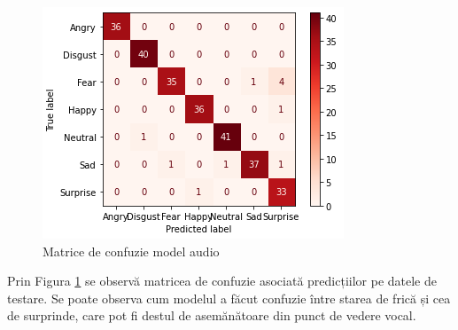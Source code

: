 \documentclass[a4paper, 12pt]{report}
\begin{document}
	\begin{figure}[H]
		\begin{center}
			\includegraphics[scale=0.7]{images/audio_confusion_matrix.png}
		\end{center}
		\caption{Matrice de confuzie model audio}
		\label{fig:audio_confusion_matrix}
	\end{figure}

	Prin Figura \ref{fig:audio_confusion_matrix} se observă matricea de confuzie asociată predicțiilor pe datele de testare. Se poate observa cum modelul a făcut confuzie între starea de frică și cea de surprinde, care pot fi destul de asemănătoare din punct de vedere vocal.
	
	
	\clearpage
\end{document}
